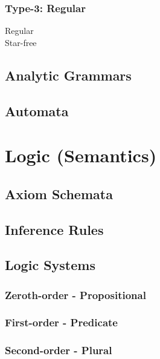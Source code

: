 \documentclass{article}
\begin{document}
\subsubsection{Type-3: Regular}

    \begin{description}

    \item[Regular]

    \item[Star-free]

    \end{description}

\subsection{Analytic Grammars}

\subsection{Automata}

\section{Logic (Semantics)}

\subsection{Axiom Schemata}

\subsection{Inference Rules}

\subsection{Logic Systems}

\subsubsection{Zeroth-order - Propositional}

\subsubsection{First-order - Predicate}

\subsubsection{Second-order - Plural}
\end{document}
